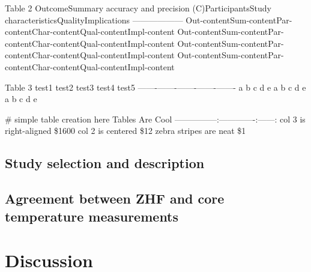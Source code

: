 \documentclass[smallextended]{svjour3}       %
\begin{document}
Table 2 \textbar{}Outcome\textbar{}Summary accuracy and precision
(C)\textbar{}Participants\textbar{}Study
characteristics\textbar{}Quality\textbar{}Implications\textbar{}
\textbar{}---\textbar{}---\textbar{}---\textbar{}---\textbar{}---\textbar{}---\textbar{}
\textbar{}Out-content\textbar{}Sum-content\textbar{}Par-content\textbar{}Char-content\textbar{}Qual-content\textbar{}Impl-content\textbar{}
\textbar{}Out-content\textbar{}Sum-content\textbar{}Par-content\textbar{}Char-content\textbar{}Qual-content\textbar{}Impl-content\textbar{}
\textbar{}Out-content\textbar{}Sum-content\textbar{}Par-content\textbar{}Char-content\textbar{}Qual-content\textbar{}Impl-content\textbar{}
\textbar{}Out-content\textbar{}Sum-content\textbar{}Par-content\textbar{}Char-content\textbar{}Qual-content\textbar{}Impl-content\textbar{}

Table 3 \textbar{} test1 \textbar{} test2 \textbar{} test3 \textbar{}
test4 \textbar{} test5 \textbar{}
\textbar{}-------\textbar{}-------\textbar{}-------\textbar{}-------\textbar{}-------\textbar{}
\textbar{} a \textbar{} b \textbar{} c \textbar{} d \textbar{} e
\textbar{} \textbar{} a \textbar{} b \textbar{} c \textbar{} d
\textbar{} e \textbar{} \textbar{} a \textbar{} b \textbar{} c
\textbar{} d \textbar{} e \textbar{}

\# simple table creation here \textbar{} Tables \textbar{} Are
\textbar{} Cool \textbar{}
\textbar{}---------------\textbar{}:-------------:\textbar{}------:\textbar{}
\textbar{} col 3 is \textbar{} right-aligned \textbar{} \$1600
\textbar{} \textbar{} col 2 is \textbar{} centered \textbar{} \$12
\textbar{} \textbar{} zebra stripes \textbar{} are neat \textbar{} \$1
\textbar{}

\hypertarget{study-selection-and-description}{%
\subsection{Study selection and
description}\label{study-selection-and-description}}

\hypertarget{agreement-between-zhf-and-core-temperature-measurements}{%
\subsection{Agreement between ZHF and core temperature
measurements}\label{agreement-between-zhf-and-core-temperature-measurements}}

\hypertarget{discussion}{%
\section{Discussion}\label{discussion}}
\end{document}
